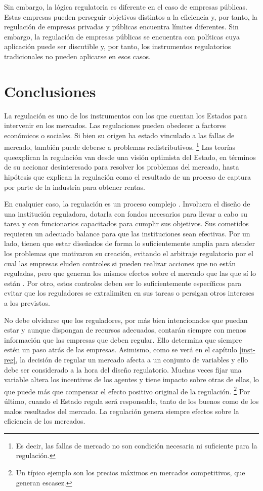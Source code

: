 \documentclass[
  12pt,
  spanish,
]{book}
\begin{document}
Sin embargo, la lógica regulatoria es diferente en el caso de empresas públicas. Estas empresas pueden perseguir objetivos distintos a la eficiencia y, por tanto, la regulación de empresas privadas y públicas encuentra límites diferentes. Sin embargo, la regulación de empresas públicas se encuentra con políticas cuya aplicación puede ser discutible y, por tanto, los instrumentos regulatorios tradicionales no pueden aplicarse en esos casos.

\hypertarget{conclusiones}{%
\section{Conclusiones}\label{conclusiones}}

La regulación es uno de los instrumentos con los que cuentan los Estados para intervenir en los mercados. Las regulaciones pueden obedecer a factores económicos o sociales. Si bien su origen ha estado vinculado a las fallas de mercado, también puede deberse a problemas redistributivos.
\footnote{Es decir, las fallas de mercado no son condición necesaria ni suficiente para la regulación.}
Las teorías queexplican la regulación van desde una visión optimista del Estado, en términos de su accionar desinteresado para resolver los problemas del mercado, hasta hipótesis que explican la regulación como el resultado de un proceso de captura por parte de la industria para obtener rentas.

En cualquier caso, la regulación es un proceso complejo \citep{Dixit1998}. Involucra el diseño de una institución reguladora, dotarla con fondos necesarios para llevar a cabo su tarea y con funcionarios capacitados para cumplir sus objetivos. Sus cometidos requieren un adecuado balance para que las instituciones sean efectivas. Por un lado, tienen que estar diseñados de forma lo suficientemente amplia para atender los problemas que motivaron su creación, evitando el arbitraje regulatorio por el cual las empresas eluden controles si pueden realizar acciones que no están reguladas, pero que generan los mismos efectos sobre el mercado que las que sí lo están . Por otro, estos controles deben ser lo suficientemente específicos para evitar que los reguladores se extralimiten en sus tareas o persigan otros intereses a los previstos.

No debe olvidarse que los reguladores, por más bien intencionados que puedan estar y aunque dispongan de recursos adecuados, contarán siempre con menos información que las empresas que deben regular. Ello determina que siempre estén un paso atrás de las empresas. Asimismo, como se verá en el capítulo \ref{inst-reg}, la decisión de regular un mercado afecta a un conjunto de variables y ello debe ser considerado a la hora del diseño regulatorio. Muchas veces fijar una variable altera los incentivos de los agentes y tiene impacto sobre otras de ellas, lo que puede más que compensar el efecto positivo original de la regulación.
\footnote{Un típico ejemplo son los precios máximos en mercados competitivos, que generan escasez.}
Por último, cuando el Estado regula será responsable, tanto de los buenos como de los malos resultados del mercado. La regulación genera siempre efectos sobre la eficiencia de los mercados.
\end{document}
